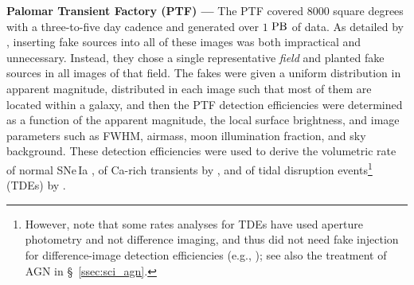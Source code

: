 \documentclass[DM,lsstdraft,toc]{lsstdoc}
\begin{document}
{\bf Palomar Transient Factory (PTF) ---} The PTF covered $8000$ square degrees with a three-to-five day cadence and generated over $1$ $\rm PB$ of data. As detailed by \cite{2017ApJS..230....4F}, inserting fake sources into all of these images was both impractical and unnecessary. Instead, they chose a single representative {\it field} and planted fake sources in all images of that field. The fakes were given a uniform distribution in apparent magnitude, distributed in each image such that most of them are located within a galaxy, and then the PTF detection efficiencies were determined as a function of the apparent magnitude, the local surface brightness, and image parameters such as FWHM, airmass, moon illumination fraction, and sky background. These detection efficiencies were used to derive the volumetric rate of normal SNe\,Ia \citep{2019MNRAS.tmp..772F}, of Ca-rich transients by \cite{2018ApJ...858...50F}, and of tidal disruption events\footnote{However, note that some rates analyses for TDEs have used aperture photometry and not difference imaging, and thus did not need fake injection for difference-image detection efficiencies (e.g., \cite{2016MNRAS.455.2918H}); see also the treatment of AGN in \S~\ref{ssec:sci_agn}.} (TDEs) by \cite{2018ApJS..238...15H}.
\end{document}
